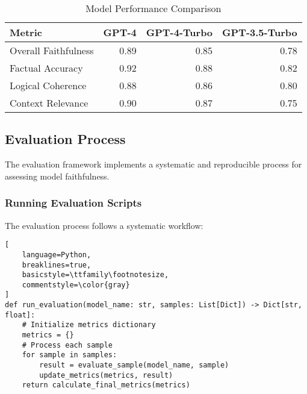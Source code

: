 \begin{table}[H]
\centering
\begin{tabular}{|l|r|r|r|}
\hline
\textbf{Metric} & \textbf{GPT-4} & \textbf{GPT-4-Turbo} & \textbf{GPT-3.5-Turbo} \\
\hline
Overall Faithfulness & 0.89 & 0.85 & 0.78 \\
Factual Accuracy & 0.92 & 0.88 & 0.82 \\
Logical Coherence & 0.88 & 0.86 & 0.80 \\
Context Relevance & 0.90 & 0.87 & 0.75 \\
\hline
\end{tabular}
\caption{Model Performance Comparison}
\label{tab:model_performance}
\end{table}

\subsection{Evaluation Process}
The evaluation framework implements a systematic and reproducible process for assessing model faithfulness.

\vspace{0.5em}
\subsubsection{Running Evaluation Scripts}
The evaluation process follows a systematic workflow:

\begin{lstlisting}[
    language=Python,
    breaklines=true,
    basicstyle=\ttfamily\footnotesize,
    commentstyle=\color{gray}
]
def run_evaluation(model_name: str, samples: List[Dict]) -> Dict[str, float]:
    # Initialize metrics dictionary
    metrics = {}
    # Process each sample
    for sample in samples:
        result = evaluate_sample(model_name, sample)
        update_metrics(metrics, result)
    return calculate_final_metrics(metrics)
\end{lstlisting}

